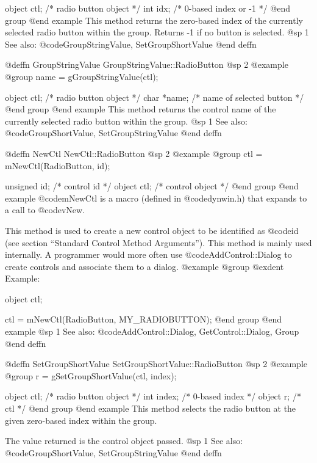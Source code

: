 {object  ctl;   /*  radio button object  */
int     idx;   /*  0-based index or -1  */
@end group
@end example
This method returns the zero-based index of the currently selected
radio button within the group.  Returns -1 if no button is selected.
@sp 1
See also:  @code{GroupStringValue, SetGroupShortValue}
@end deffn



@deffn {GroupStringValue} GroupStringValue::RadioButton
@sp 2
@example
@group
name = gGroupStringValue(ctl);

object  ctl;    /*  radio button object  */
char    *name;  /*  name of selected button  */
@end group
@end example
This method returns the control name of the currently selected radio
button within the group.
@sp 1
See also:  @code{GroupShortValue, SetGroupStringValue}
@end deffn











@deffn {NewCtl} NewCtl::RadioButton
@sp 2
@example
@group
ctl = mNewCtl(RadioButton, id);

unsigned  id;   /*  control id      */
object   ctl;   /*  control object  */
@end group
@end example
@code{mNewCtl} is a macro (defined in @code{dynwin.h}) that expands to
a call to @code{vNew}.

This method is used to create a new control object to be identified as
@code{id} (see section ``Standard Control Method Arguments'').  This
method is mainly used internally.  A programmer would more often
use @code{AddControl::Dialog} to create controls and associate them
to a dialog.
@example
@group
@exdent Example:

object  ctl;

ctl = mNewCtl(RadioButton, MY_RADIOBUTTON);
@end group
@end example
@sp 1
See also:  @code{AddControl::Dialog, GetControl::Dialog, Group}
@end deffn



@deffn {SetGroupShortValue} SetGroupShortValue::RadioButton
@sp 2
@example
@group
r = gSetGroupShortValue(ctl, index);

object  ctl;    /*  radio button object  */
int     index;  /*  0-based index        */
object  r;      /*  ctl                  */
@end group
@end example
This method selects the radio button at the given zero-based index
within the group.

The value returned is the control object passed.
@sp 1
See also:  @code{GroupShortValue, SetGroupStringValue}
@end deffn



}
